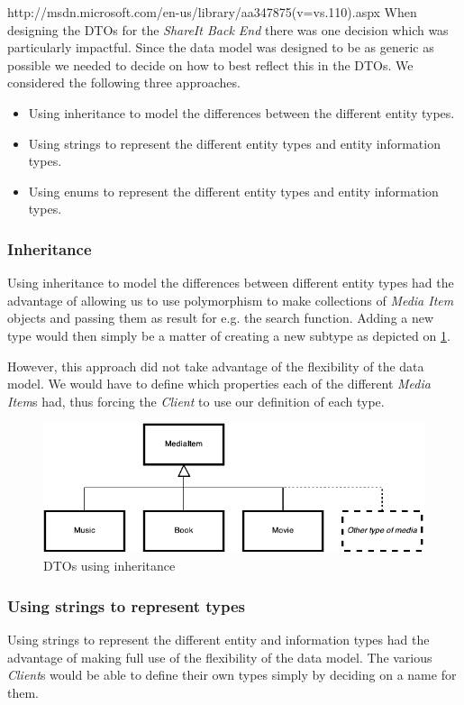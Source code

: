 \documentclass[../report.tex]{subfiles}
\begin{document}
\graphicspath{{img/}{../img/}}

http://msdn.microsoft.com/en-us/library/aa347875(v=vs.110).aspx
When designing the DTOs for the \textit{ShareIt Back End} there was one decision which was particularly impactful. Since the data model was designed to be as generic as possible we needed to decide on how to best reflect this in the DTOs. We considered the following three approaches.
\begin{itemize}
\item Using inheritance to model the differences between the different entity types.
\item Using strings to represent the different entity types and entity information types.
\item Using enums to represent the different entity types and entity information types.
\end{itemize}

\subsubsection{Inheritance}
Using inheritance to model the differences between different entity types had the advantage of allowing us to use polymorphism to make collections of \textit{Media Item} objects and passing them as result for e.g. the search function. Adding a new type would then simply be a matter of creating a new subtype as depicted on \ref{fig:dto_inheritance}.
 
However, this approach did not take advantage of the flexibility of the data model. We would have to define which properties each of the different \textit{Media Item}s had, thus forcing the \textit{Client} to use our definition of each type.

\begin{figure}[!h]
\label{fig:dto_inheritance}
\centering
\includegraphics[scale=0.7]{DTOInheritance.pdf}
\caption{DTOs using inheritance}
\end{figure}

\subsubsection{Using strings to represent types}
Using strings to represent the different entity and information types had the advantage of making full use of the flexibility of the data model. The various \textit{Client}s would be able to define their own types simply by deciding on a name for them. 
\end{document}
